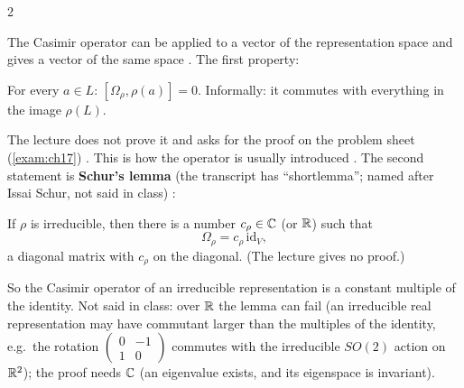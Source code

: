 \begin{paracol}{2}
\begin{coursenote}
\end{coursenote}
The Casimir operator can be applied to a vector of the representation space and gives a vector of the same space . The first property:
\begin{theorem}\label{thm:rp-commute}
For every $a\in L$: $[\Omega_\rho,\rho(a)]=0$. Informally: it commutes with everything in the image $\rho(L)$.
\end{theorem}
The lecture does not prove it and asks for the proof on the problem sheet (\cref{exam:ch17})   . This is how the operator is usually introduced . The second statement is \textbf{Schur's lemma} (the transcript has ``shortlemma''; named after Issai Schur, not said in class) :
\begin{theorem}\label{thm:rp-schur}
If $\rho$ is irreducible, then there is a number $c_\rho\in\mathbb{C}$ (or $\mathbb{R}$) such that
\[
  \Omega_\rho=c_\rho\,\mathrm{id}_V ,
\]
a diagonal matrix with $c_\rho$ on the diagonal. (The lecture gives no proof.) 
\end{theorem}
So the Casimir operator of an irreducible representation is a constant multiple of the identity. Not said in class: over $\mathbb{R}$ the lemma can fail (an irreducible real representation may have commutant larger than the multiples of the identity, e.g.\ the rotation $\begin{pmatrix}0&-1\\1&0\end{pmatrix}$ commutes with the irreducible $SO(2)$ action on $\mathbb{R}^2$); the proof needs $\mathbb{C}$ (an eigenvalue exists, and its eigenspace is invariant).


\end{paracol}
